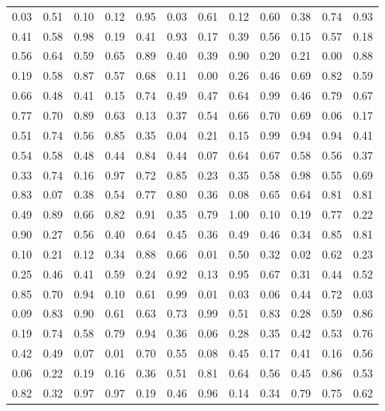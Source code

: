 \begin{center}
\begin{tabular}{llllllllllll}
0.03 & 0.51 & 0.10 & 0.12 & 0.95 & 0.03 & 0.61 & 0.12 & 0.60 & 0.38 & 0.74 & 0.93  \\
0.41 & 0.58 & 0.98 & 0.19 & 0.41 & 0.93 & 0.17 & 0.39 & 0.56 & 0.15 & 0.57 & 0.18  \\
0.56 & 0.64 & 0.59 & 0.65 & 0.89 & 0.40 & 0.39 & 0.90 & 0.20 & 0.21 & 0.00 & 0.88  \\
0.19 & 0.58 & 0.87 & 0.57 & 0.68 & 0.11 & 0.00 & 0.26 & 0.46 & 0.69 & 0.82 & 0.59  \\
0.66 & 0.48 & 0.41 & 0.15 & 0.74 & 0.49 & 0.47 & 0.64 & 0.99 & 0.46 & 0.79 & 0.67  \\
0.77 & 0.70 & 0.89 & 0.63 & 0.13 & 0.37 & 0.54 & 0.66 & 0.70 & 0.69 & 0.06 & 0.17  \\
0.51 & 0.74 & 0.56 & 0.85 & 0.35 & 0.04 & 0.21 & 0.15 & 0.99 & 0.94 & 0.94 & 0.41  \\
0.54 & 0.58 & 0.48 & 0.44 & 0.84 & 0.44 & 0.07 & 0.64 & 0.67 & 0.58 & 0.56 & 0.37  \\
0.33 & 0.74 & 0.16 & 0.97 & 0.72 & 0.85 & 0.23 & 0.35 & 0.58 & 0.98 & 0.55 & 0.69  \\
0.83 & 0.07 & 0.38 & 0.54 & 0.77 & 0.80 & 0.36 & 0.08 & 0.65 & 0.64 & 0.81 & 0.81  \\
0.49 & 0.89 & 0.66 & 0.82 & 0.91 & 0.35 & 0.79 & 1.00 & 0.10 & 0.19 & 0.77 & 0.22  \\
0.90 & 0.27 & 0.56 & 0.40 & 0.64 & 0.45 & 0.36 & 0.49 & 0.46 & 0.34 & 0.85 & 0.81  \\
0.10 & 0.21 & 0.12 & 0.34 & 0.88 & 0.66 & 0.01 & 0.50 & 0.32 & 0.02 & 0.62 & 0.23  \\
0.25 & 0.46 & 0.41 & 0.59 & 0.24 & 0.92 & 0.13 & 0.95 & 0.67 & 0.31 & 0.44 & 0.52  \\
0.85 & 0.70 & 0.94 & 0.10 & 0.61 & 0.99 & 0.01 & 0.03 & 0.06 & 0.44 & 0.72 & 0.03  \\
0.09 & 0.83 & 0.90 & 0.61 & 0.63 & 0.73 & 0.99 & 0.51 & 0.83 & 0.28 & 0.59 & 0.86  \\
0.19 & 0.74 & 0.58 & 0.79 & 0.94 & 0.36 & 0.06 & 0.28 & 0.35 & 0.42 & 0.53 & 0.76  \\
0.42 & 0.49 & 0.07 & 0.01 & 0.70 & 0.55 & 0.08 & 0.45 & 0.17 & 0.41 & 0.16 & 0.56  \\
0.06 & 0.22 & 0.19 & 0.16 & 0.36 & 0.51 & 0.81 & 0.64 & 0.56 & 0.45 & 0.86 & 0.53  \\
0.82 & 0.32 & 0.97 & 0.97 & 0.19 & 0.46 & 0.96 & 0.14 & 0.34 & 0.79 & 0.75 & 0.62 
\end{tabular}
\end{center}